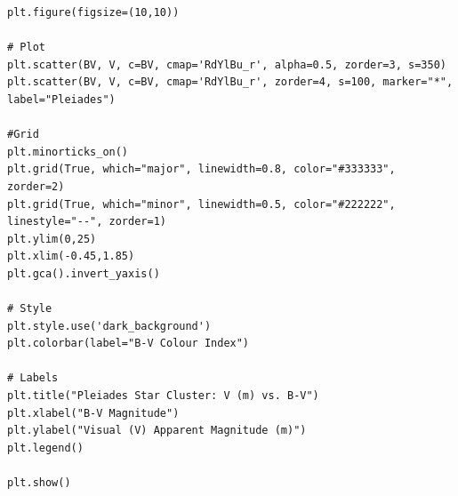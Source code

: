 \documentclass[12pt]{article}
\begin{document}
\begin{minipage}{\linewidth}
\captionsetup{hypcap=false}

\begin{mintedbox}
\begin{verbatim}
plt.figure(figsize=(10,10))

# Plot
plt.scatter(BV, V, c=BV, cmap='RdYlBu_r', alpha=0.5, zorder=3, s=350)
plt.scatter(BV, V, c=BV, cmap='RdYlBu_r', zorder=4, s=100, marker="*", label="Pleiades")

#Grid
plt.minorticks_on()
plt.grid(True, which="major", linewidth=0.8, color="#333333", zorder=2)
plt.grid(True, which="minor", linewidth=0.5, color="#222222", linestyle="--", zorder=1)
plt.ylim(0,25)
plt.xlim(-0.45,1.85)
plt.gca().invert_yaxis()

# Style
plt.style.use('dark_background')
plt.colorbar(label="B-V Colour Index")

# Labels
plt.title("Pleiades Star Cluster: V (m) vs. B-V")
plt.xlabel("B-V Magnitude")
plt.ylabel("Visual (V) Apparent Magnitude (m)")
plt.legend()

plt.show()

\end{verbatim}
\end{mintedbox}

\end{minipage}
\end{document}
